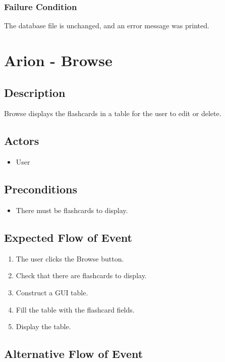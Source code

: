 \documentclass{scrreprt}
\begin{document}
    \subsection{Failure Condition}
    The database file is unchanged, and an error message was printed.

\chapter{Arion - Browse}

\section{Description}
Browse displays the flashcards in a table for the user to edit or delete.

\section{Actors}
\begin{itemize}
    \item User
\end{itemize}

\section{Preconditions}
\begin{itemize}
    \item There must be flashcards to display.
\end{itemize}

\section{Expected Flow of Event}
\begin{enumerate}[1.]
    \item The user clicks the Browse button.
    \item Check that there are flashcards to display.
    \item Construct a GUI table.
    \item Fill the table with the flashcard fields.
    \item Display the table.
\end{enumerate}

\section{Alternative Flow of Event}
\end{document}
